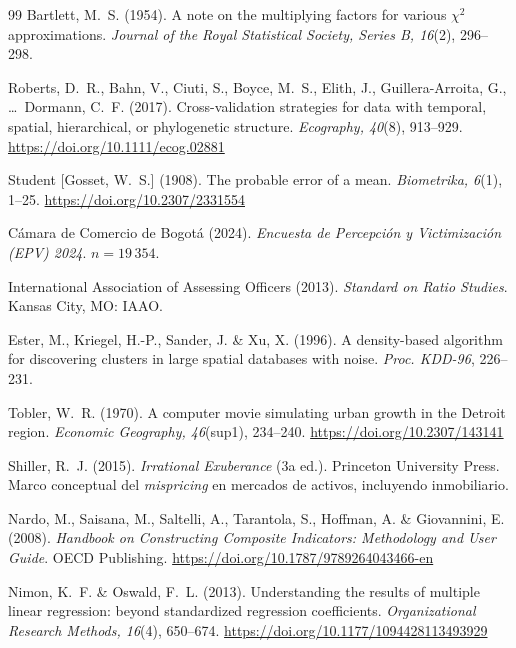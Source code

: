 \documentclass[12pt, a4paper, twoside, openright]{report}
\theoremstyle{plain}
\theoremstyle{definition}
\begin{document}
\begin{thebibliography}{99}
Bartlett, M.~S. (1954).
A note on the multiplying factors for various $\chi^2$ approximations.
\textit{Journal of the Royal Statistical Society, Series B, 16}(2), 296--298.

Roberts, D.~R., Bahn, V., Ciuti, S., Boyce, M.~S., Elith, J.,
Guillera-Arroita, G., \ldots\ Dormann, C.~F. (2017).
Cross-validation strategies for data with temporal, spatial, hierarchical,
or phylogenetic structure.
\textit{Ecography, 40}(8), 913--929.
\href{https://doi.org/10.1111/ecog.02881}{https://doi.org/10.1111/ecog.02881}

Student [Gosset, W.~S.] (1908).
The probable error of a mean.
\textit{Biometrika, 6}(1), 1--25.
\href{https://doi.org/10.2307/2331554}{https://doi.org/10.2307/2331554}

Cámara de Comercio de Bogotá (2024).
\textit{Encuesta de Percepción y Victimización (EPV) 2024}. $n = 19\,354$.

International Association of Assessing Officers (2013).
\textit{Standard on Ratio Studies}.
Kansas City, MO: IAAO.

Ester, M., Kriegel, H.-P., Sander, J. \& Xu, X. (1996).
A density-based algorithm for discovering clusters in large spatial
databases with noise.
\textit{Proc. KDD-96}, 226--231.

Tobler, W.~R. (1970).
A computer movie simulating urban growth in the Detroit region.
\textit{Economic Geography, 46}(sup1), 234--240.
\href{https://doi.org/10.2307/143141}{https://doi.org/10.2307/143141}


Shiller, R.~J. (2015).
\textit{Irrational Exuberance} (3a ed.).
Princeton University Press.
Marco conceptual del \emph{mispricing} en mercados de activos, incluyendo inmobiliario.

Nardo, M., Saisana, M., Saltelli, A., Tarantola, S., Hoffman, A. \& Giovannini, E. (2008).
\textit{Handbook on Constructing Composite Indicators: Methodology and User Guide}.
OECD Publishing.
\href{https://doi.org/10.1787/9789264043466-en}{https://doi.org/10.1787/9789264043466-en}

Nimon, K.~F. \& Oswald, F.~L. (2013).
Understanding the results of multiple linear regression: beyond standardized regression coefficients.
\textit{Organizational Research Methods, 16}(4), 650--674.
\href{https://doi.org/10.1177/1094428113493929}{https://doi.org/10.1177/1094428113493929}


\end{thebibliography}
\end{document}
